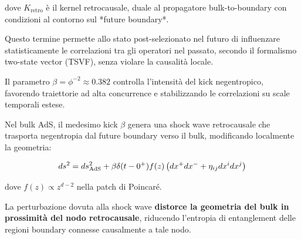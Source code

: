 \documentclass[11pt,a4paper]{article}
\theoremstyle{plain}
\theoremstyle{definition}
\begin{document}
\vspace{0.3cm}

dove $K_{\text{retro}}$ è il kernel retrocausale, duale al propagatore bulk-to-boundary con condizioni al contorno sul *future boundary*. 

\vspace{0.3cm}


Questo termine permette allo stato post-selezionato nel futuro di influenzare statisticamente le correlazioni tra gli operatori nel passato, secondo il formalismo two-state vector (TSVF), senza violare la causalità locale. 


\vspace{0.3cm}



Il parametro $\beta = \phi^{-2} \approx 0.382$ controlla l'intensità del kick negentropico, favorendo traiettorie ad alta concurrence e stabilizzando le correlazioni su scale temporali estese.

\vspace{0.3cm}

Nel bulk AdS, il medesimo kick $\beta$ genera una shock wave retrocausale che trasporta negentropia dal future boundary verso il bulk, modificando localmente la geometria:

\vspace{0.4cm}

\begin{tcolorbox}[
  colback=violet!3!white, 
  colframe=violet!70!black, 
  title=Shock wave retrocausale in AdS/CFT, 
  fonttitle=\bfseries,
  breakable,
  enhanced,
  width=\textwidth,
  boxrule=0.8pt,
  arc=4pt
]
\begin{equation}
ds^2 = ds^2_{\rm AdS} + \beta \delta(t-0^+) f(z) \left( dx^+ dx^- + \eta_{ij} dx^i dx^j \right)
\label{eq:shock_wave_retro}
\end{equation}
\end{tcolorbox}


\vspace{0.3cm}

dove $f(z) \propto z^{d-2}$ nella patch di Poincaré. 

\vspace{0.2cm}

La perturbazione dovuta alla shock wave \textbf{distorce la geometria del bulk in prossimità del nodo retrocausale}, riducendo l'entropia di entanglement delle regioni boundary connesse causalmente a tale nodo.


\vspace{0.5cm}
\end{document}
